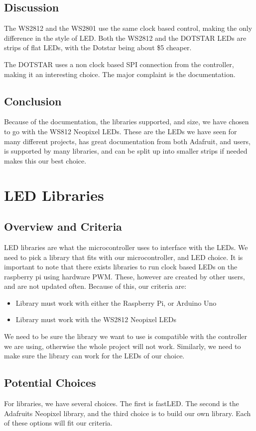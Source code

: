 \documentclass[onecolumn, draftclsnofoot,10pt, compsoc]{IEEEtran}
\begin{document}
		\subsection{Discussion}
		The WS2812 and the WS2801 use the same clock based control, making the only
		difference in the style of LED. Both the WS2812 and the DOTSTAR LEDs are
		strips of flat LEDs, with the Dotstar being about \$5 cheaper.

		\vspace{5mm}
		\noindent The DOTSTAR uses a non clock based SPI connection from the
		controller, making it an interesting choice. The major complaint is the
		documentation.
		\subsection{Conclusion}
		\noindent Because of the documentation, the libraries supported, and size,
		we have chosen to go with the WS812 Neopixel LEDs. These are the LEDs we
		have seen for many different projects, has great documentation from both
		Adafruit, and users, is supported by many libraries, and can be split up
		into smaller strips if needed makes this our best choice.


	\section{LED Libraries}
		\subsection{Overview and Criteria}
		\noindent LED libraries are what the microcontroller uses to interface with
		the LEDs. We need to pick a library that fits with our microcontroller, and
		LED choice. It is important to note that there exists libraries to run
		clock based LEDs on the raspberry pi using hardware PWM. These, however
		are created by other users, and are not updated often. Because of this, our
		criteria are:
		\begin{itemize}
			\item Library must work with either the Raspberry Pi, or Arduino Uno
			\item Library must work with the WS2812 Neopixel LEDs
		\end{itemize}
		\noindent We need to be sure the library we want to use is compatible with
		the controller we are using, otherwise the whole project will not work.
		Similarly, we need to make sure the library can work for the LEDs of our
		choice.
		\subsection{Potential Choices}
		\noindent For libraries, we have several choices. The first is fastLED. The
		second is the Adafruits Neopixel library, and the third choice is to build
		our own library. Each of these options will fit our criteria.
\end{document}
